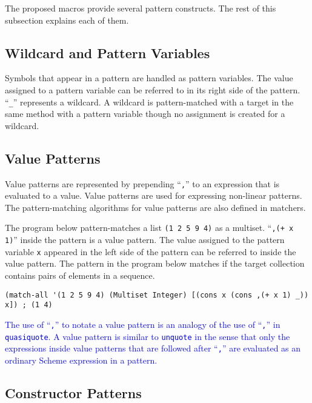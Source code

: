 \documentclass[acmlarge]{acmart}
\newcommand{\new}[1]{\textcolor{blue}{#1}}
\begin{document}
The proposed macros provide several pattern constructs.
The rest of this subsection explains each of them.

\subsection{Wildcard and Pattern Variables}

Symbols that appear in a pattern are handled as pattern variables.
The value assigned to a pattern variable can be referred to in its right side of the pattern.
``\lstinline{_}'' represents a wildcard.
A wildcard is pattern-matched with a target in the same method with a pattern variable though no assignment is created for a wildcard.

\subsection{Value Patterns}

Value patterns are represented by prepending ``\lstinline{,}'' to an expression that is evaluated to a value.
Value patterns are used for expressing non-linear patterns.
The pattern-matching algorithms for value patterns are also defined in matchers.

The program below pattern-matches a list \lstinline{(1 2 5 9 4)} as a multiset.
``\lstinline{,(+ x 1)}'' inside the pattern is a value pattern.
The value assigned to the pattern variable \lstinline{x} appeared in the left side of the pattern can be referred to inside the value pattern.
The pattern in the program below matches if the target collection contains pairs of elements in a sequence.

\begin{lstlisting}[language=egison]
(match-all '(1 2 5 9 4) (Multiset Integer) [(cons x (cons ,(+ x 1) _)) x]) ; (1 4)
\end{lstlisting}

\new{
The use of ``\lstinline{,}'' to notate a value pattern is an analogy of the use of ``\lstinline{,}'' in \lstinline{quasiquote}.
A value pattern is similar to \lstinline{unquote} in the sense that only the expressions inside value patterns that are followed after ``\lstinline{,}'' are evaluated as an ordinary Scheme expression in a pattern.
}%

\subsection{Constructor Patterns}
\end{document}
